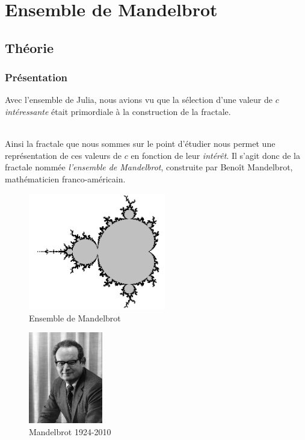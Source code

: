 \documentclass[a4paper,10pt]{report}
\begin{document}
\section{Ensemble de Mandelbrot}
\subsection{Théorie}
\subsubsection{Présentation}
Avec l'ensemble de Julia, nous avions vu que la sélection d'une valeur de $c$ \textit{intéressante} était primordiale à la construction de la fractale. \\ \\
\begin{minipage}[c]{.70\linewidth}
	Ainsi la fractale que nous sommes sur le point d'étudier nous permet une représentation de ces valeurs de $c$ en fonction de leur \textit{intérêt}. Il s'agit donc de la fractale nommée \textit{l'ensemble de Mandelbrot}, construite par Benoît Mandelbrot, mathématicien franco-américain.
\begin{figure}[H]
\centering
\caption{Ensemble de Mandelbrot}
\label{mandelbrot}
\centering
\includegraphics[width=6cm]{mandelbrot.png}
\end{figure}	
\end{minipage} \hfill
\begin{minipage}[c]{.05\linewidth}
\end{minipage} \hfill
\begin{minipage}[c]{.21\linewidth}
	\begin{figure}[H]
	\includegraphics[height=4cm]{mr_mandelbrot.jpg}
	\caption{Mandelbrot 1924-2010}
	\end{figure}
\end{minipage}
\end{document}

